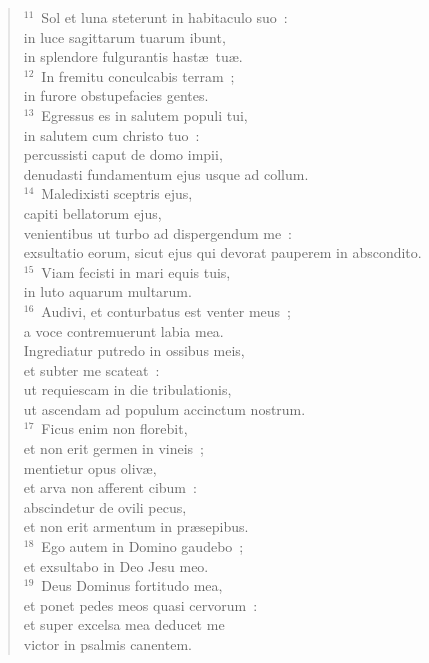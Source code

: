 \begin{flushleft}
\begin{verse}
${}^{11}$~Sol et luna steterunt in habitaculo suo~:\\ in luce sagittarum tuarum ibunt,\\ in splendore fulgurantis hast\ae\ tu\ae .\\
${}^{12}$~In fremitu conculcabis terram~;\\ in furore obstupefacies gentes.\\
${}^{13}$~Egressus es in salutem populi tui,\\ in salutem cum christo tuo~:\\ percussisti caput de domo impii,\\ denudasti fundamentum ejus usque ad collum.\\
${}^{14}$~Maledixisti sceptris ejus,\\ capiti bellatorum ejus,\\ venientibus ut turbo ad dispergendum me~:\\ exsultatio eorum, sicut ejus qui devorat pauperem in abscondito.\\
${}^{15}$~Viam fecisti in mari equis tuis,\\ in luto aquarum multarum.\\
${}^{16}$~Audivi, et conturbatus est venter meus~;\\ a voce contremuerunt labia mea.\\ Ingrediatur putredo in ossibus meis,\\ et subter me scateat~:\\ ut requiescam in die tribulationis,\\ ut ascendam ad populum accinctum nostrum.\\
${}^{17}$~Ficus enim non florebit,\\ et non erit germen in vineis~;\\ mentietur opus oliv\ae ,\\ et arva non afferent cibum~:\\ abscindetur de ovili pecus,\\ et non erit armentum in pr\ae sepibus.\\
${}^{18}$~Ego autem in Domino gaudebo~;\\ et exsultabo in Deo Jesu meo.\\
${}^{19}$~Deus Dominus fortitudo mea,\\ et ponet pedes meos quasi cervorum~:\\ et super excelsa mea deducet me\\ victor in psalmis canentem.\end{verse}\end{flushleft}


